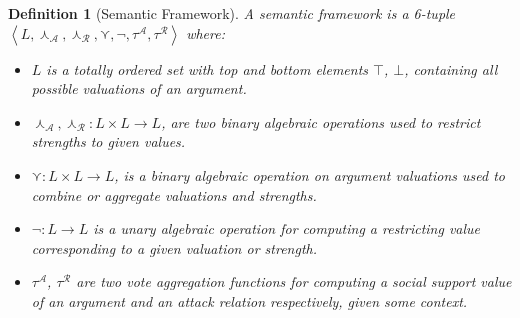 \documentclass{article}
\newtheorem{definition}{Definition}
\newcommand{\args}{\mathcal{A}} %
\newcommand{\att}{\mathcal{R}}  %
\newcommand{\valueset}{L}
\newcommand{\sembodyNew}{\left\langle \valueset,\SAFand_\mathcal{A}, \SAFand_\mathcal{R}, \SAFor, \lnot, \tau^{\args}, \tau^{\att}\right\rangle} %
\newcommand{\SAFand}{\curlywedge}     %
\newcommand{\SAFor}{\curlyvee}        %
\begin{document}
\begin{definition}[Semantic Framework]
\label{def:semfram}
A semantic framework is a 6-tuple \\$\sembodyNew$ where:

\begin{itemize}
  \item $\valueset$ is a totally ordered set with top and bottom elements $\top$, 
$\bot$, containing all possible valuations of an argument. 

  \item $\SAFand_\args,\SAFand_\att:\valueset\times \valueset\rightarrow \valueset$, are two binary algebraic operations used to restrict strengths to given values.
  
  \item $\SAFor:\valueset\times \valueset\rightarrow \valueset$, is a binary algebraic operation on argument valuations used to combine or aggregate valuations and strengths.
  
  \item $\lnot:\valueset\rightarrow \valueset$ is a unary algebraic operation for computing a restricting value corresponding to a given valuation or strength.
  
  \item $\tau^{\args}$, $\tau^{\att}$ are two vote aggregation functions for computing a social support value of an argument and an attack relation respectively, given some context.

\end{itemize}
\end{definition}
\end{document}
